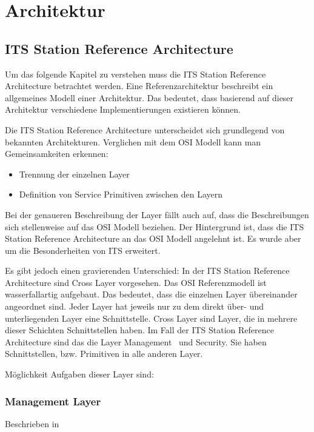 \chapter{Architektur  \label{chap_archtitektur}}
\section{ITS Station Reference Architecture}
Um das folgende Kapitel zu verstehen muss die \ac{ITS} Station Reference Architecture betrachtet werden. Eine Referenzarchitektur beschreibt ein allgemeines Modell einer Architektur. Das bedeutet, dass basierend auf dieser Architektur verschiedene Implementierungen existieren können. 

Die \ac{ITS} Station Reference Architecture unterscheidet sich grundlegend von bekannten Architekturen. Verglichen mit dem \ac{OSI} Modell kann man Gemeinsamkeiten erkennen:
\begin{itemize}
	\item Trennung der einzelnen Layer
	\item Definition von Service Primitiven zwischen den Layern
\end{itemize}

Bei der genaueren Beschreibung der Layer fällt auch auf, dass die Beschreibungen sich stellenweise auf das \ac{OSI} Modell beziehen. Der Hintergrund ist, dass die \ac{ITS} Station Reference Architecture an das \ac{OSI} Modell angelehnt ist. Es wurde aber um die Besonderheiten von \ac{ITS} erweitert.

Es gibt jedoch einen gravierenden Unterschied: In der \ac{ITS} Station Reference Architecture sind Cross Layer vorgesehen. Das \ac{OSI} Referenzmodell ist wasserfallartig aufgebaut. Das bedeutet, dass die einzelnen Layer übereinander angeordnet sind. Jeder Layer hat jeweils nur zu dem direkt über- und unterliegenden Layer eine Schnittstelle. Cross Layer sind Layer, die in mehrere dieser Schichten Schnittstellen haben. Im Fall der \ac{ITS} Station Reference Architecture sind das die Layer \glqq Management\grqq~ und \glqq Security\grqq. Sie haben Schnittstellen, bzw. Primitiven in alle anderen Layer. 

Möglichkeit Aufgaben dieser Layer sind:
\subsection{Management Layer}
Beschrieben in \cite{etsi1027232}

